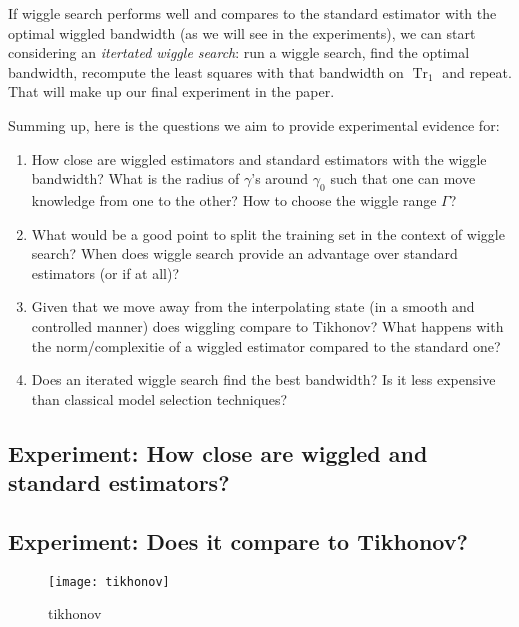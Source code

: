 \documentclass[12pt]{amsart}
\DeclareMathOperator{\Tr}{Tr}
\begin{document}
If wiggle search performs well and compares to the standard estimator 
with the optimal wiggled bandwidth (as we will see in the experiments), 
we can start considering an \emph{itertated wiggle search}:
run a wiggle search, find the optimal bandwidth, recompute the 
least squares with that bandwidth on $\Tr_1$ and repeat.
That will make up our final experiment in the paper.

Summing up, here is the questions we aim to provide experimental 
evidence for:
\begin{enumerate}
    \item How close are wiggled estimators and standard estimators with 
        the wiggle bandwidth? 
        What is the radius of $\gamma$'s around $\gamma_0$ such that one 
        can move knowledge from one to the other? 
        How to choose the wiggle range $\Gamma$?
    \item What would be a good point to split the training set in the 
        context of wiggle search?
        When does wiggle search provide an advantage over standard 
        estimators (or if at all)?
    \item Given that we move away from the interpolating state 
        (in a smooth and controlled manner) does wiggling compare to 
        Tikhonov?
        What happens with the norm/complexitie of a wiggled estimator
        compared to the standard one?
    \item Does an iterated wiggle search find the best bandwidth?
        Is it less expensive than classical model selection techniques?
\end{enumerate}

\subsection{Experiment: How close are wiggled and standard estimators?}

\subsection{Experiment: Does it compare to Tikhonov?}

\begin{figure}[htp]
    \centering
    \texttt{[image: tikhonov]}
    \caption{tikhonov}
    \label{fig:tikhonov}
\end{figure}
\end{document}
